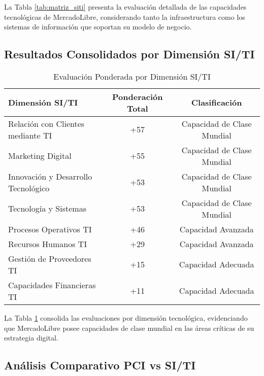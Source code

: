 La Tabla \ref{tab:matriz_siti} presenta la evaluación detallada de las capacidades tecnológicas de MercadoLibre, considerando tanto la infraestructura como los sistemas de información que soportan su modelo de negocio.

\subsection{Resultados Consolidados por Dimensión SI/TI}

\begin{table}[H]
\centering
\begin{tabular}{|l|c|c|}
\hline
\textbf{Dimensión SI/TI} & \textbf{Ponderación Total} & \textbf{Clasificación} \\
\hline
Relación con Clientes mediante TI & +57 & Capacidad de Clase Mundial \\
\hline
Marketing Digital & +55 & Capacidad de Clase Mundial \\
\hline
Innovación y Desarrollo Tecnológico & +53 & Capacidad de Clase Mundial \\
\hline
Tecnología y Sistemas & +53 & Capacidad de Clase Mundial \\
\hline
Procesos Operativos TI & +46 & Capacidad Avanzada \\
\hline
Recursos Humanos TI & +29 & Capacidad Avanzada \\
\hline
Gestión de Proveedores TI & +15 & Capacidad Adecuada \\
\hline
Capacidades Financieras TI & +11 & Capacidad Adecuada \\
\hline
\end{tabular}
\caption{Evaluación Ponderada por Dimensión SI/TI}
\label{tab:resultados_siti}
\end{table}

La Tabla \ref{tab:resultados_siti} consolida las evaluaciones por dimensión tecnológica, evidenciando que MercadoLibre posee capacidades de clase mundial en las áreas críticas de su estrategia digital.

\subsection{Análisis Comparativo PCI vs SI/TI}

